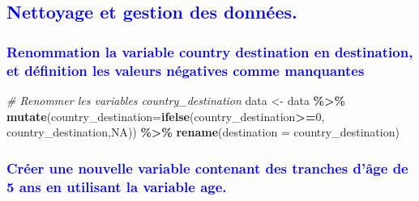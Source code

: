 \documentclass[
]{article}
\newenvironment{Shaded}{\begin{snugshade}}{\end{snugshade}}
\newcommand{\AttributeTok}[1]{\textcolor[rgb]{0.13,0.29,0.53}{#1}}
\newcommand{\CommentTok}[1]{\textcolor[rgb]{0.56,0.35,0.01}{\textit{#1}}}
\newcommand{\ConstantTok}[1]{\textcolor[rgb]{0.56,0.35,0.01}{#1}}
\newcommand{\DecValTok}[1]{\textcolor[rgb]{0.00,0.00,0.81}{#1}}
\newcommand{\FunctionTok}[1]{\textcolor[rgb]{0.13,0.29,0.53}{\textbf{#1}}}
\newcommand{\NormalTok}[1]{#1}
\newcommand{\OtherTok}[1]{\textcolor[rgb]{0.56,0.35,0.01}{#1}}
\newcommand{\SpecialCharTok}[1]{\textcolor[rgb]{0.81,0.36,0.00}{\textbf{#1}}}
\begin{document}
\hfill\break

\textcolor{blue}{\subsection{Nettoyage et gestion des données.}}

\textcolor{blue}{\subsubsection{Renommation la variable country destination en destination, et définition les valeurs négatives comme manquantes}}

\hfill\break

\begin{Shaded}
\begin{Highlighting}[]
\CommentTok{\# Renommer les variables country\_destination}
\NormalTok{data }\OtherTok{\textless{}{-}}\NormalTok{ data }\SpecialCharTok{\%\textgreater{}\%} 
          \FunctionTok{mutate}\NormalTok{(}\AttributeTok{country\_destination=}\FunctionTok{ifelse}\NormalTok{(country\_destination}\SpecialCharTok{\textgreater{}=}\DecValTok{0}\NormalTok{, }
\NormalTok{                                            country\_destination,}\ConstantTok{NA}\NormalTok{)) }\SpecialCharTok{\%\textgreater{}\%} 
            \FunctionTok{rename}\NormalTok{(}\AttributeTok{destination =}\NormalTok{ country\_destination)  }
\end{Highlighting}
\end{Shaded}

\hfill\break

\textcolor{blue}{\subsubsection{ Créer une nouvelle variable contenant des tranches d'âge de 5 ans en utilisant la variable age.}}

\hfill\break
\end{document}

